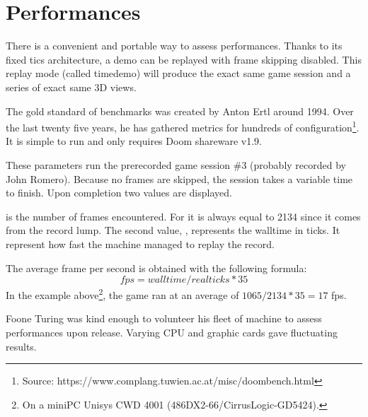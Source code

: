 \section{Performances}
There is a convenient and portable way to assess performances. Thanks to its fixed tics architecture, a demo can be replayed with frame skipping disabled. This replay mode (called timedemo) will produce the exact same game session and a series of exact same 3D views.\\
\par
The gold standard of benchmarks was created by Anton Ertl around 1994. Over the last twenty five years, he has gathered metrics for hundreds of configuration\footnote{Source: https://www.complang.tuwien.ac.at/misc/doombench.html}.  It is simple to run and only requires Doom shareware v1.9.\\
\par
{}
\par
These parameters run the prerecorded game session \#3 (probably recorded by John Romero). Because no frames are skipped, the session takes a variable time to finish. Upon completion two values are displayed.\\
\par
{}
\par

 is the number of frames encountered. For  it is always equal to 2134 since it comes from the record lump. The second value, , represents the walltime in ticks. It represent how fast the machine managed to replay the record.\\
\par
 The average frame per second is obtained with the following formula: $$ fps = walltime/realticks * 35 $$ 
In the example above\footnote{On a miniPC Unisys CWD 4001 (486DX2-66/CirrusLogic-GD5424).}, the game ran at an average of $1065/2134*35 = 17$ fps.\\
\par
Foone Turing was kind enough to volunteer his fleet of machine to assess performances upon release. Varying CPU and graphic cards gave fluctuating results.\\
\par

